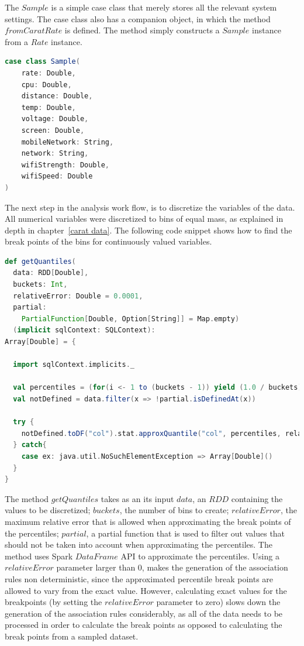 The $Sample$ is a simple case class that merely stores all the relevant system settings. The case class also has a companion object, in which the method $fromCaratRate$ is defined. The method simply constructs a $Sample$ instance from a $Rate$ instance. 

\begin{minipage}{\linewidth}
\begin{lstlisting}[language=scala]
case class Sample(
	rate: Double,
	cpu: Double,
	distance: Double,
	temp: Double,
	voltage: Double,
	screen: Double,
	mobileNetwork: String,
	network: String,
	wifiStrength: Double,
	wifiSpeed: Double
)
\end{lstlisting}
\end{minipage}  

The next step in the analysis work flow, is to discretize the variables of the data. All numerical variables were discretized to bins of equal mass, as explained in depth in chapter~\ref{carat data}. The following code snippet shows how to find the break points of the bins for continuously valued variables.

\begin{minipage}{\linewidth}
\begin{lstlisting}[language=scala] 
def getQuantiles(
  data: RDD[Double],
  buckets: Int,
  relativeError: Double = 0.0001,
  partial: 
  	PartialFunction[Double, Option[String]] = Map.empty)
  (implicit sqlContext: SQLContext): 
Array[Double] = {
	
  import sqlContext.implicits._

  val percentiles = (for(i <- 1 to (buckets - 1)) yield (1.0 / buckets) * i).toArray
  val notDefined = data.filter(x => !partial.isDefinedAt(x))

  try {
    notDefined.toDF("col").stat.approxQuantile("col", percentiles, relativeError)
  } catch{
    case ex: java.util.NoSuchElementException => Array[Double]()
  }
}
\end{lstlisting}
\end{minipage}  

The method $getQuantiles$ takes as an its input $data$, an $RDD$ containing the values to be discretized; $buckets$, the number of bins to create; $relativeError$, the maximum relative error that is allowed when approximating the break points of the percentiles; $partial$, a partial function that is used to filter out values that should not be taken into account when approximating the percentiles. The method uses Spark $DataFrame$ API to approximate the percentiles. Using a $relativeError$ parameter larger than 0, makes the generation of the association rules non deterministic, since the approximated percentile break points are allowed to vary from the exact value. However, calculating exact values for the breakpoints (by setting the $relativeError$ parameter to zero) slows down the generation of the association rules considerably, as all of the data needs to be processed in order to calculate the break points as opposed to calculating the break points from a sampled dataset.

